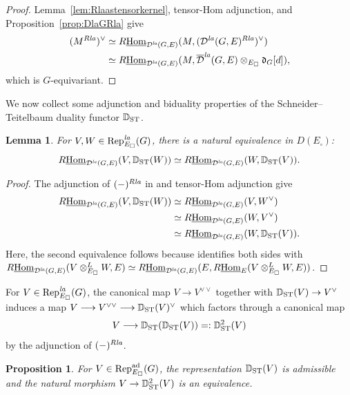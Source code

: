\documentclass[a4paper,10pt]{amsart}
\theoremstyle{remark}
\theoremstyle{definition}
\theoremstyle{plain}
\newtheorem{lemma}[theorem]{Lemma}
\newtheorem{proposition}[theorem]{Proposition}
\numberwithin{equation}{section}
\newcommand{\bbD}{{\mathbb D}}
\newcommand{\calD}{{\mathcal D}}
\newcommand{\Hom}{{\rm Hom}}
\newcommand{\uHom}{\underline{\Hom}}
\newcommand{\la}{{\it la}}
\newcommand{\Rep}{{\rm Rep}}
\newcommand{\ST}{{\rm ST}}
\begin{document}
\begin{proof}
Lemma~\ref{lem:Rlaastensorkernel}, tensor-Hom adjunction, and Proposition~\ref{prop:DlaGRla} give
\begin{align*}
 (M^{R\la})^\vee
 &\simeq R\underline{\mathrm{Hom}}_{\calD^{\la}(G,E)}
 (M,(\calD^{\la}(G,E)^{R\la})^\vee)\\
 &\simeq R\underline{\mathrm{Hom}}_{\calD^{\la}(G,E)}
 (M,\overline{\calD}^{\la}(G,E)\otimes_{E_{\square}}\mathfrak d_G[d]),
\end{align*}
which is $G$-equivariant.
\end{proof}

We now collect some adjunction and biduality properties of the Schneider--Teitelbaum duality functor $\bbD_{\ST}$.
\begin{lemma}\label{lem:ST-transpose}
For $V,W\in\Rep^{\la}_{E_\square}(G)$, there is a natural equivalence in $D(E_\square)$:
\[
 R\underline{\mathrm{Hom}}_{\calD^{\la}(G,E)}
 (V,\bbD_{\ST}(W))
 \simeq
 R\underline{\mathrm{Hom}}_{\calD^{\la}(G,E)}
 (W,\bbD_{\ST}(V)).
\]
\end{lemma}

\begin{proof}
The adjunction of $(-)^{R\la}$ in \cite[Cor.~3.3.7]{JC23} and tensor-Hom adjunction give
\begin{align*}
 R\underline{\mathrm{Hom}}_{\calD^{\la}(G,E)}
 (V,\bbD_{\ST}(W))
 &\simeq
 R\underline{\mathrm{Hom}}_{\calD^{\la}(G,E)}(V,W^\vee)\\
 &\simeq
 R\underline{\mathrm{Hom}}_{\calD^{\la}(G,E)}(W,V^\vee)\\
 &\simeq
 R\underline{\mathrm{Hom}}_{\calD^{\la}(G,E)}
 (W,\bbD_{\ST}(V)).
\end{align*}
Here, the second equivalence follows because \cite[Prop.~A.2.1(2),(4)]{JC23} identifies both sides with  $R\underline{\mathrm{Hom}}_{\calD^{\la}(G,E)}(V\otimes^L_{E_\square}W,E)\simeq R\underline{\mathrm{Hom}}_{\calD^{\la}(G,E)}(E,R\uHom_E(V\otimes^L_{E_\square}W,E))$.
\end{proof}
For $V\in \Rep_{E_{\square}}^{\la}(G)$, the canonical map $V\to V^{\vee\vee}$ together with $\bbD_{\ST}(V)\to V^{\vee}$ induces a map $V\longrightarrow V^{\vee\vee}\longrightarrow \bbD_{\ST}(V)^\vee$
which factors through a canonical map 
\[V\longrightarrow \bbD_{\ST}(\bbD_{\ST}(V))=:\bbD_{\ST}^2(V)\]
by the adjunction of $(-)^{R\la}$.
\begin{proposition}\label{prop:ST-biduality-admissible}
For $V\in\Rep^{\mathrm{ad}}_{E_\square}(G)$, the representation $\bbD_{\ST}(V)$ is admissible and the natural morphism $V\to\bbD_{\ST}^2(V)$ is an equivalence.
\end{proposition}
\end{document}
